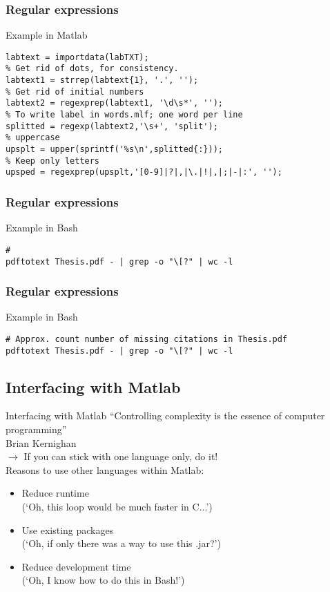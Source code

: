 \documentclass[]{beamer} %
\begin{document}
\begin{frame}[fragile]\frametitle{Regular expressions}\centering
\begin{exampleblock}{Example in Matlab}
\begin{verbatim}
labtext = importdata(labTXT);
% Get rid of dots, for consistency.
labtext1 = strrep(labtext{1}, '.', ''); 
% Get rid of initial numbers
labtext2 = regexprep(labtext1, '\d\s*', ''); 
% To write label in words.mlf; one word per line
splitted = regexp(labtext2,'\s+', 'split');
% uppercase
upsplt = upper(sprintf('%s\n',splitted{:}));
% Keep only letters
upsped = regexprep(upsplt,'[0-9]|?|,|\.|!|,|;|-|:', '');
\end{verbatim}
\end{exampleblock}
\end{frame}


\begin{frame}[fragile]\frametitle{Regular expressions}\centering
\begin{exampleblock}{Example in Bash}
\begin{verbatim}
#
pdftotext Thesis.pdf - | grep -o "\[?" | wc -l
\end{verbatim}
\end{exampleblock}
\end{frame}


\begin{frame}[fragile]\frametitle{Regular expressions}\centering
\begin{exampleblock}{Example in Bash}
\begin{verbatim}
# Approx. count number of missing citations in Thesis.pdf
pdftotext Thesis.pdf - | grep -o "\[?" | wc -l
\end{verbatim}
\end{exampleblock}
\end{frame}


\subsection{Interfacing with Matlab}
\begin{frame}{Interfacing with Matlab}
``Controlling complexity is the essence of computer programming'' \\
\hfill Brian Kernighan\\[5mm]
\pause
$\to$ If you can stick with one language only, do it!\\[5mm]
\pause
Reasons to use other languages within Matlab:
\pause
\begin{itemize}[<+(0)->]
\item Reduce runtime \\(`Oh, this loop would be much faster in C...')
\item Use existing packages \\(`Oh, if only there was a way to use this .jar?')
\item Reduce development time \\(`Oh, I know how to do this in Bash!')
\end{itemize}
\end{frame}
\end{document}
